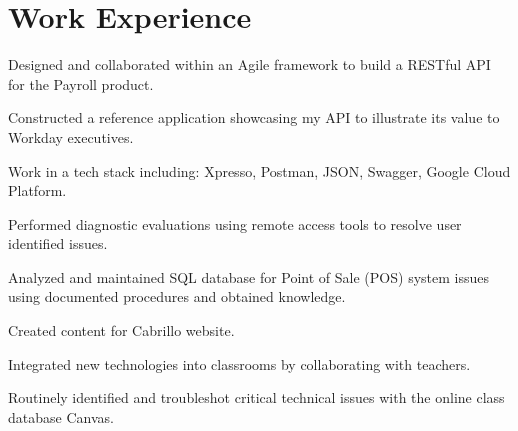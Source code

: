 \documentclass[]{deedy-resume-openfont}
\begin{document}
\hfill
\begin{minipage}[t]{0.66\textwidth} 


\section{Work Experience}

\vspace{\topsep} %
\begin{tightemize}
\item Designed and collaborated within an Agile framework to build a RESTful API for the Payroll product. 
\item Constructed a reference application showcasing my API to   illustrate its value to Workday executives. 
\item Work in a tech stack including: Xpresso, Postman, JSON, Swagger, Google Cloud Platform.
\end{tightemize}
\sectionsep


\begin{tightemize}
\item Performed diagnostic evaluations using remote access tools to resolve user identified issues.
\item Analyzed and maintained SQL database for Point of Sale (POS) system issues using documented procedures and obtained knowledge.
\end{tightemize}
\sectionsep


\begin{tightemize}
\item Created content for Cabrillo website.
\item Integrated new technologies into classrooms by collaborating with teachers. 
\item Routinely identified and troubleshot critical technical issues with the online class database Canvas. 

\end{tightemize}
\sectionsep



\end{minipage}
\end{document}
